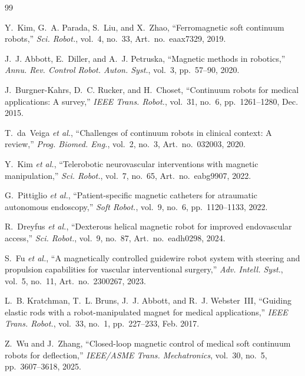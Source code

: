 \documentclass[journal]{IEEEtran}
\begin{document}
\begin{thebibliography}{99}
\footnotesize

Y.~Kim, G.~A. Parada, S.~Liu, and X.~Zhao, ``Ferromagnetic soft continuum
robots,'' \emph{Sci. Robot.}, vol.~4, no.~33, Art.~no.~eaax7329, 2019.

J.~J. Abbott, E.~Diller, and A.~J. Petruska, ``Magnetic methods in
robotics,'' \emph{Annu. Rev. Control Robot. Auton. Syst.}, vol.~3,
pp.~57--90, 2020.

J.~Burgner-Kahrs, D.~C. Rucker, and H.~Choset, ``Continuum robots for
medical applications: A survey,'' \emph{IEEE Trans. Robot.}, vol.~31,
no.~6, pp.~1261--1280, Dec. 2015.

T.~da~Veiga \emph{et al.}, ``Challenges of continuum robots in clinical
context: A review,'' \emph{Prog. Biomed. Eng.}, vol.~2, no.~3,
Art.~no.~032003, 2020.

Y.~Kim \emph{et al.}, ``Telerobotic neurovascular interventions with
magnetic manipulation,'' \emph{Sci. Robot.}, vol.~7, no.~65,
Art.~no.~eabg9907, 2022.

G.~Pittiglio \emph{et al.}, ``Patient-specific magnetic catheters for
atraumatic autonomous endoscopy,'' \emph{Soft Robot.}, vol.~9, no.~6,
pp.~1120--1133, 2022.

R.~Dreyfus \emph{et al.}, ``Dexterous helical magnetic robot for improved
endovascular access,'' \emph{Sci. Robot.}, vol.~9, no.~87,
Art.~no.~eadh0298, 2024.

S.~Fu \emph{et al.}, ``A magnetically controlled guidewire robot system
with steering and propulsion capabilities for vascular interventional
surgery,'' \emph{Adv. Intell. Syst.}, vol.~5, no.~11, Art.~no.~2300267,
2023.

L.~B. Kratchman, T.~L. Bruns, J.~J. Abbott, and R.~J. Webster~III,
``Guiding elastic rods with a robot-manipulated magnet for medical
applications,'' \emph{IEEE Trans. Robot.}, vol.~33, no.~1, pp.~227--233,
Feb. 2017.

Z.~Wu and J.~Zhang, ``Closed-loop magnetic control of medical soft
continuum robots for deflection,'' \emph{IEEE/ASME Trans. Mechatronics},
vol.~30, no.~5, pp.~3607--3618, 2025.


\end{thebibliography}
\end{document}
